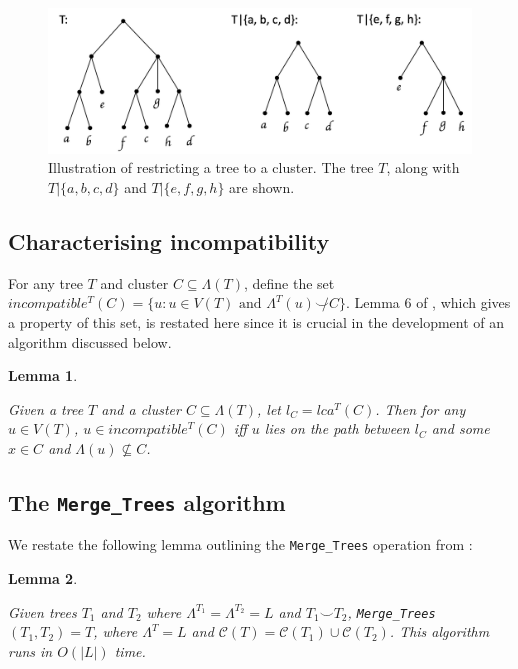 \documentclass{article}
\newcommand{\compatible}{\smile}
\newcommand{\leafset}{\Lambda}
\newtheorem{incompatibility}{Lemma}
\newtheorem{mergetrees}[incompatibility]{Lemma}
\begin{document}
    \begin{figure}[ht]
        \includegraphics[scale=0.5]{restrictedsubtree}
        \centering
        \caption[Restricted subtrees]{Illustration of restricting a tree to a cluster. The tree $T$, along with $T|\{a, b, c, d\}$ and $T|\{e, f, g, h\}$ are shown.}
        \label{fig:restrictedsubtree}
    \end{figure}

    \subsection{Characterising incompatibility}

    For any tree $T$ and cluster $C \subseteq \leafset(T)$, define the set $incompatible^{T}(C) = \{u : u \in V(T) \text{ and } \leafset^{T}(u) \not\compatible C\}$. Lemma 6 of \cite{jansson2018algorithms}, which gives a property of this set, is restated here since it is crucial in the development of an algorithm discussed below.
    \newline

    \begin{incompatibility}
        \label{lem:incompatibility}

        Given a tree $T$ and a cluster $C \subseteq \leafset(T)$, let $l_C = lca^T(C)$. Then for any $u \in V(T)$, $u \in incompatible^{T}(C)$ iff $u$ lies on the path between $l_C$ and some $x \in C$ and $\leafset(u) \not\subseteq C$.
    \end{incompatibility}

    \subsection{The \texttt{Merge\_Trees} algorithm}
    \label{subsec:mergetrees}

    We restate the following lemma outlining the \texttt{Merge\_Trees} operation from \cite{jansson2016improved}:
    \newline

    \begin{mergetrees}
        \label{lem:mergetrees}

        Given trees $T_1$ and $T_2$ where $\leafset^{T_1} = \leafset^{T_2} = L$ and $T_1 \compatible T_2$, \texttt{Merge\_Trees}$(T_1, T_2) = T$, where $\leafset^T = L$ and $\mathcal{C}(T) = \mathcal{C}(T_1) \cup \mathcal{C}(T_2)$. This algorithm runs in $O(|L|)$ time.
    \end{mergetrees}
\end{document}
